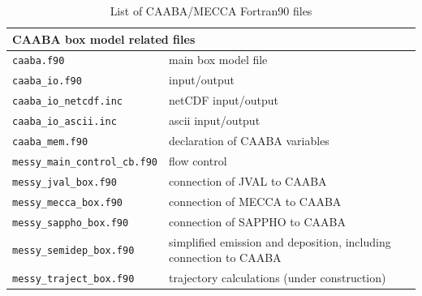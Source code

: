 \documentclass[twoside]{article}
\begin{document}
\begin{table}[htb]
  \begin{center}
    \caption{List of CAABA/MECCA Fortran90 files}
    \label{tab:files}
    \begin{tabular}{lp{}}
      \hline
      \multicolumn{2}{l}{CAABA box model related files}\\
      \hline
      \verb|caaba.f90|                         & main box model file\\
      \verb|caaba_io.f90|                      & input/output\\
      \verb|caaba_io_netcdf.inc|               & netCDF input/output\\
      \verb|caaba_io_ascii.inc|                & ascii input/output\\
      \verb|caaba_mem.f90|                     & declaration of CAABA variables\\
      \verb|messy_main_control_cb.f90|         & flow control\\
      \verb|messy_jval_box.f90|                & connection of JVAL to CAABA\\
      \verb|messy_mecca_box.f90|               & connection of MECCA to CAABA\\
      \verb|messy_sappho_box.f90|              & connection of SAPPHO to CAABA\\
      \verb|messy_semidep_box.f90|             & simplified emission and
                                                 deposition, including
                                                 connection to CAABA\\
      \verb|messy_traject_box.f90|             & trajectory calculations
                                                 (under construction)\\ 

\end{tabular}
\end{center}
\end{table}
\end{document}
